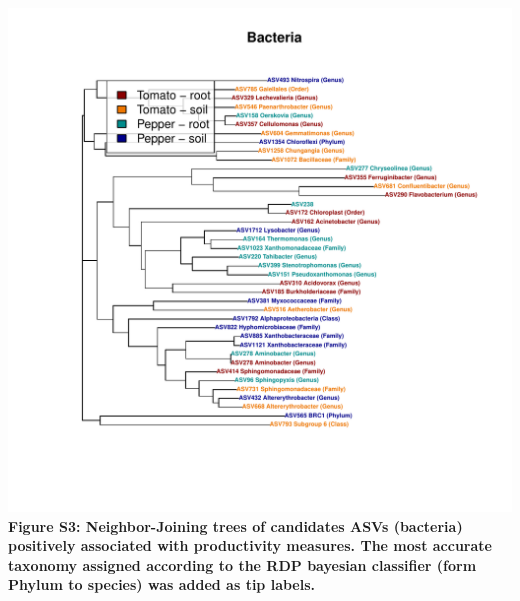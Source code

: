 \documentclass[11pt,]{article}
\begin{document}
\includegraphics{../figures/bacteria/Figure7_bacteria_tree.pdf}\\
\textbf{Figure S3: Neighbor-Joining trees of candidates ASVs (bacteria)
positively associated with productivity measures. The most accurate
taxonomy assigned according to the RDP bayesian classifier (form Phylum
to species) was added as tip labels.} ~\\
\hspace*{0.333em}\\
\hspace*{0.333em}




\newpage
\singlespacing 
\end{document}

